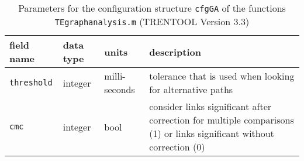\begin{table}[H]
\small
\caption[Parameters \texttt{cfgGA}]{Parameters for the configuration structure \texttt{cfgGA} of the functions \texttt{TEgraphanalysis.m} (TRENTOOL Version 3.3)} 
\begin{tabularx}{\textwidth}{p{2cm}p{1.1cm}p{2cm}X} \toprule
\textbf{field name} &  \textbf{data type} & \textbf{units} & \textbf{description} \\ \midrule
\verb+threshold+ & integer & milli-seconds & tolerance that is used when looking for alternative paths\\
\rowcolor{Gray}
\verb+cmc+ & integer & bool & consider links significant after correction for multiple comparisons (1) or links significant without correction (0)\\
\bottomrule
\end{tabularx} \label{tab:cfgGA}
\end{table}